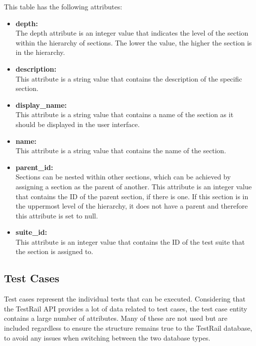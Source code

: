 This table has the following attributes:~\cite{TRSections}
\begin{itemize}
    \item \textbf{depth:} \\
    The depth attribute is an integer value that indicates the level of the section within the hierarchy of sections. The lower the value, the higher the section is in the hierarchy.

    \item \textbf{description:} \\
    This attribute is a string value that contains the description of the specific section.

    \item \textbf{display_name:} \\
    This attribute is a string value that contains a name of the section as it should be displayed in the user interface.

    \item \textbf{name:} \\
    This attribute is a string value that contains the name of the section.

    \item \textbf{parent_id:} \\
    Sections can be nested within other sections, which can be achieved by assigning a section as the parent of another. This attribute is an integer value that contains the ID of the parent section, if there is one. If this section is in the uppermost level of the hierarchy, it does not have a parent and therefore this attribute is set to null.

    \item \textbf{suite_id:} \\
    This attribute is an integer value that contains the ID of the test suite that the section is assigned to.
\end{itemize}

\subsection{Test Cases}

Test cases represent the individual tests that can be executed. Considering that the TestRail API provides a lot of data related to test cases, the test case entity contains a large number of attributes. Many of these are not used but are included regardless to ensure the structure remains true to the TestRail database, to avoid any issues when switching between the two database types.

